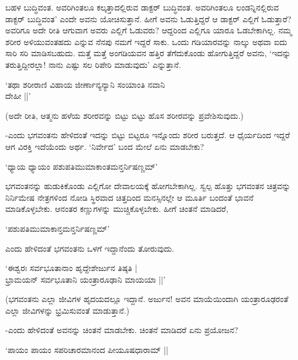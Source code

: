 ಬಹಳ ಬುದ್ಧಿವಂತ. ಅವರಿಗಿಂತಲೂ ಕಲ್ಕತ್ತಾದಲ್ಲಿರುವ ಡಾಕ್ಟರ್ ಬುದ್ಧಿವಂತ. ಅವರಿಗಿಂತಲೂ ಲಂಡನ್ನಿನಲ್ಲಿರುವ ಡಾಕ್ಟರ್ ಬುದ್ಧಿವಂತ' ಎಂದೇ ಅವನು ಯೋಚಿಸುತ್ತಾನೆ. ಹೀಗೆ ಅವನು ಓಡುತ್ತಿದ್ದರೆ ಆ ಡಾಕ್ಟರ್ ಎಲ್ಲಿಗೆ ಓಡುತ್ತಾರೆ? ಅವರಿಗೂ ಅದೇ ರೀತಿ ಆಗುವಾಗ ಅವರು ಎಲ್ಲಿಗೆ ಓಡುವರು? ಆದ್ದರಿಂದ ಎಲ್ಲಿಗೂ ಯಾರೂ ಓಡಬೇಕಾಗಿಲ್ಲ. ನಮ್ಮ ಶರೀರ ಅಳಿಯುವಂತಹದು ಎನ್ನುವ ನೆನಪು ನಮಗೆ ಇದ್ದರೆ ಸಾಕು. ಒಂದು ಗಡಿಯಾರವನ್ನು ನಾಲ್ಕು ಅಥವಾ ಐದು ಸಾರಿ ಸರಿ ಮಾಡಿಸಬಹುದು. ಮತ್ತೆ ಮತ್ತೆ ಅಂಗಡಿಯವನ ಹತ್ತಿರ ತೆಗೆದುಕೊಂಡು ಹೋಗುತ್ತಿದ್ದರೆ ಅವನು, `ಇದನ್ನು ತರುತ್ತಿದ್ದೀರಲ್ಲಾ! ನಾನು ಎಷ್ಟು ಸಲ ರಿಪೇರಿ ಮಾಡುವುದು' ಎನ್ನುತ್ತಾನೆ.

\begin{shloka}
`ತಥಾ ಶರೀರಾಣಿ ವಿಹಾಯ ಜೀರ್ಣಾನ್ಯನ್ಯಾನಿ ಸಂಯಾಂತಿ ನವಾನಿ\\
\hspace{5.5cm} ದೇಹೀ ||'
\end{shloka}

(ಅದೇ ರೀತಿ, ಆತ್ಮನು ಹಳೆಯ ಶರೀರವನ್ನು ಬಿಟ್ಟು ಬಿಟ್ಟು ಹೊಸ ಶರೀರವನ್ನು ಪ್ರವೇಶಿಸುವುದು.)


-ಎಂದು ಭಗವಂತನು ಹೇಳಿದಂತೆ ಇದನ್ನು ಬಿಟ್ಟು ಬಿಟ್ಟರೂ ಇನ್ನೊಂದು ಶರೀರ ಬರುತ್ತದೆ. ಆ ಧೈರ್ಯದಿಂದ ಇದ್ದರೆ ಆಗ ವಿರಕ್ತಿ ಇದೆಯೆಂದು ಅರ್ಥ. `ನಿರ್ವೇದ' ಬಂದ ಮೇಲೆ ಏನು ಮಾಡಬೇಕು?

\begin{shloka}
`ಧ್ಯಾಯ ಧ್ಯಾಯಂ ಪಶುಪತಿಮುಮಾಕಾಂತಮನ್ತರ್ನಿಷಣ್ಣಮ್'
\end{shloka}

ಭಗವಂತನನ್ನು ಹುಡುಕಿಕೊಂಡು ಎಲ್ಲಿಗೋ ದೇವಾಲಯಕ್ಕೆ ಹೋಗಬೇಕಾಗಿಲ್ಲ. ಸ್ವಲ್ಪ ಹೊತ್ತು ಭಗವಂತನ ಚಿತ್ರವನ್ನು ನಿರ್ನಿಮೇಷ ನೇತ್ರಗಳಿಂದ ನೋಡಿ ಸ್ಥಿರವಾದ ಚಿತ್ತದಿಂದ ಮನಸ್ಸಿನಲ್ಲೇ ಆ ಮೂರ್ತಿ ಬಂದಂತೆ ಭಾವನೆ ಮಾಡಿಕೊಳ್ಳಬೇಕು. ಆನಂತರ ಕಣ್ಣುಗಳನ್ನು ಮುಚ್ಚಿಕೊಳ್ಳಬೇಕು. ಹೀಗೆ ಚಿಂತನೆ ಮಾಡಿದರೆ,

\begin{shloka}
`ಪಶುಪತಿಮುಮಾಕಾನ್ತಮನ್ತರ್ನಿಷಣ್ಣಮ್'
\end{shloka}

ಎಂದು ಹೇಳಿದಂತೆ ಭಗವಂತನು ಒಳಗೆ ಇದ್ದಾನೆಂದು ತೋರುವುದು.

\begin{shloka}
`ಈಶ್ವರಃ ಸರ್ವಭೂತಾನಾಂ ಹೃದ್ದೇಶೇರ್ಜುನ ತಿಷ್ಠತಿ |\\
ಭ್ರಾಮಯನ್ ಸರ್ವಭೂತಾನಿ ಯಂತ್ರಾರೂಢಾನಿ ಮಾಯಯಾ ||'
\end{shloka}

(ಭಗವಂತನು ಎಲ್ಲಾ ಜೀವಿಗಳ ಹೃದಯದಲ್ಲೂ ಇದ್ದಾನೆ. ಅರ್ಜುನ! ಅವನ ಮಾಯೆಯಿಂದಾಗಿ ಯಂತ್ರಾರೂಢರಂತೆ ಎಲ್ಲಾ ಜೀವಿಗಳನ್ನು ಭ್ರಮಿಸುವಂತೆ ಮಾಡುತ್ತಾನೆ.)

-ಎಂದು ಹೇಳಿದಂತೆ ಅವನನ್ನು ಚಿಂತನೆ ಮಾಡಬೇಕು. ಚಿಂತನೆ ಮಾಡಿದರೆ ಏನು ಪ್ರಯೋಜನ?

\begin{shloka}
`ಪಾಯಂ ಪಾಯಂ ಸಪರಿಚಾರಮಾನಂದ ಪೀಯೂಷಧಾರಾಮ್ ||
\end{shloka}

